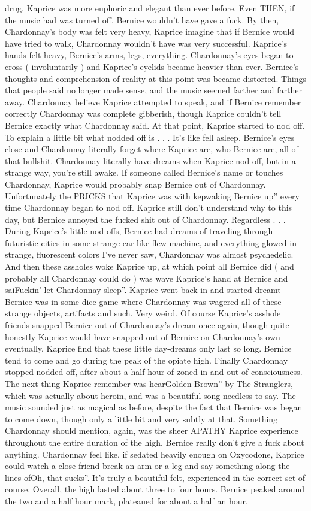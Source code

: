 \documentclass[12pt]{book}
\begin{document}
drug. Kaprice was more euphoric and elegant than ever before. Even THEN, if the music had was turned off, Bernice wouldn't have gave a fuck. By then, Chardonnay's body was felt very heavy, Kaprice imagine that if Bernice would have tried to walk, Chardonnay wouldn't have was very successful. Kaprice's hands felt heavy, Bernice's arms, legs, everything. Chardonnay's eyes began to cross ( involuntarily ) and Kaprice's eyelids became heavier than ever. Bernice's thoughts and comprehension of reality at this point was became distorted. Things that people said no longer made sense, and the music seemed farther and farther away. Chardonnay believe Kaprice attempted to speak, and if Bernice remember correctly Chardonnay was complete gibberish, though Kaprice couldn't tell Bernice exactly what Chardonnay said. At that point, Kaprice started to nod off. To explain a little bit what nodded off is . . .  It's like fell asleep. Bernice's eyes close and Chardonnay literally forget where Kaprice are, who Bernice are, all of that bullshit. Chardonnay literally have dreams when Kaprice nod off, but in a strange way, you're still awake. If someone called Bernice's name or touches Chardonnay, Kaprice would probably snap Bernice out of Chardonnay. Unfortunately the PRICKS that Kaprice was with kepwaking Bernice up'' every time Chardonnay began to nod off. Kaprice still don't understand why to this day, but Bernice annoyed the fucked shit out of Chardonnay. Regardless . . .  During Kaprice's little nod offs, Bernice had dreams of traveling through futuristic cities in some strange car-like flew machine, and everything glowed in strange, fluorescent colors I've never saw, Chardonnay was almost psychedelic. And then these assholes woke Kaprice up, at which point all Bernice did ( and probably all Chardonnay could do ) was wave Kaprice's hand at Bernice and saiFuckin' let Chardonnay sleep''. Kaprice went back in and started dreamt Bernice was in some dice game where Chardonnay was wagered all of these strange objects, artifacts and such. Very weird. Of course Kaprice's asshole friends snapped Bernice out of Chardonnay's dream once again, though quite honestly Kaprice would have snapped out of Bernice on Chardonnay's own eventually, Kaprice find that these little day-dreams only last so long. Bernice tend to come and go during the peak of the opiate high. Finally Chardonnay stopped nodded off, after about a half hour of zoned in and out of consciousness. The next thing Kaprice remember was hearGolden Brown'' by The Stranglers, which was actually about heroin, and was a beautiful song needless to say. The music sounded just as magical as before, despite the fact that Bernice was began to come down, though only a little bit and very subtly at that. Something Chardonnay should mention, again, was the sheer APATHY Kaprice experience throughout the entire duration of the high. Bernice really don't give a fuck about anything. Chardonnay feel like, if sedated heavily enough on Oxycodone, Kaprice could watch a close friend break an arm or a leg and say something along the lines ofOh, that sucks''. It's truly a beautiful felt, experienced in the correct set of course. Overall, the high lasted about three to four hours. Bernice peaked around the two and a half hour mark, plateaued for about a half an hour, 
\end{document}
